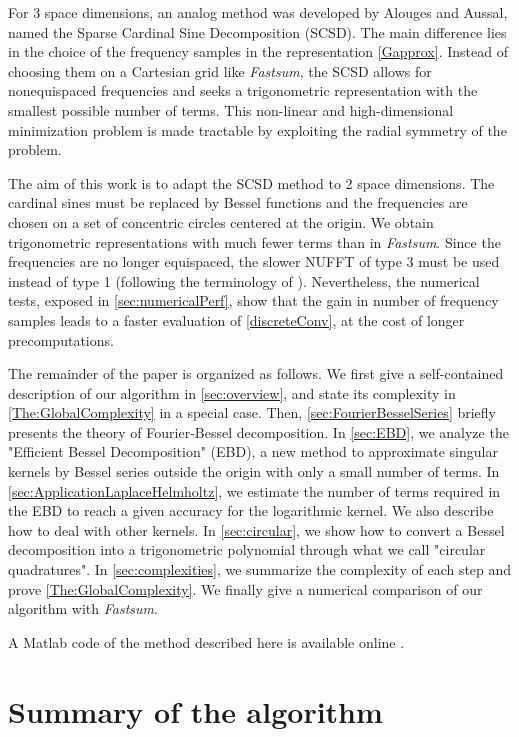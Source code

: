 \documentclass[main]{subfiles}
\begin{document}
For 3 space dimensions, an analog method was developed by Alouges and Aussal, named the Sparse Cardinal Sine Decomposition (SCSD). The main difference lies in the choice of the frequency samples in the representation \eqref{Gapprox}. Instead of choosing them on a Cartesian grid like \textit{Fastsum}, the SCSD allows for nonequispaced frequencies and seeks a trigonometric representation with the smallest possible number of terms. This non-linear and high-dimensional minimization problem is made tractable by exploiting the radial symmetry of the problem. 

The aim of this work is to adapt the SCSD method to 2 space dimensions. The cardinal sines must be replaced by Bessel functions and the frequencies are chosen on a set of concentric circles centered at the origin. We obtain trigonometric representations with much fewer terms than in \textit{Fastsum}. Since the frequencies are no longer equispaced, the slower NUFFT of type 3 must be used instead of type 1 (following the terminology of \cite{lee2005type}). Nevertheless, the numerical tests, exposed in \autoref{sec:numericalPerf}, show that the gain in number of frequency samples leads to a faster evaluation of \eqref{discreteConv}, at the cost of longer precomputations.

The remainder of the paper is organized as follows. We first give a self-contained description of our algorithm in \autoref{sec:overview}, and state its complexity in \autoref{The:GlobalComplexity} in a special case. Then, \autoref{sec:FourierBesselSeries} briefly presents the theory of Fourier-Bessel decomposition. In \autoref{sec:EBD}, we analyze the "Efficient Bessel Decomposition" (EBD), a new method to approximate singular kernels by Bessel series outside the origin with only a small number of terms. In \autoref{sec:ApplicationLaplaceHelmholtz}, we estimate the number of terms required in the EBD to reach a given accuracy for the logarithmic kernel. We also describe how to deal with other kernels. In \autoref{sec:circular}, we show how to convert a Bessel decomposition into a trigonometric polynomial through what we call "circular quadratures". In \autoref{sec:complexities}, we summarize the complexity of each step and prove \autoref{The:GlobalComplexity}. We finally give a numerical comparison of our algorithm with \textit{Fastsum}. 

A Matlab code of the method described here is available online \cite{EBD}. 


\section{Summary of the algorithm}
\end{document}
